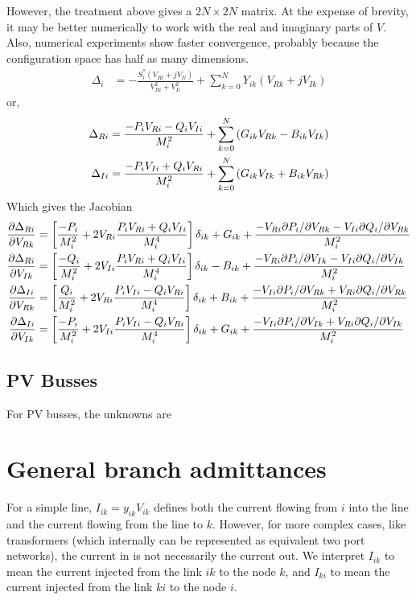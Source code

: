 \documentclass[11pt]{article}
\begin{document}
However, the treatment above gives a $2N \times 2N$ matrix. At the expense of brevity, it may be better numerically to work with the real and imaginary parts of $V$. Also, numerical experiments show faster convergence, probably because the configuration space has half as many dimensions.
\begin{align}
\Delta_i &= -\frac{S^*_i\left(V_{Ri}+jV_{Ii}\right)}{V_{Ri}^2 + V_{Ii}^2} + \sum_{k=0}^NY_{ik}\left(V_{Rk} + j V_{Ik}\right)
\end{align}
or,
\begin{align}
\Delta_{Ri} &= \frac{-P_iV_{Ri}-Q_iV_{Ii}}{M^2_i} + \sum_{k=0}^N\left(G_{ik}V_{Rk} - B_{ik}V_{Ik}\right)\notag \\
\Delta_{Ii} &= \frac{-P_iV_{Ii}+Q_iV_{Ri}}{M^2_i} + \sum_{k=0}^N\left(G_{ik}V_{Ik} + B_{ik}V_{Rk}\right)
\end{align}
Which gives the Jacobian
\begin{align}
\frac{\partial \Delta_{Ri}}{\partial V_{Rk}} &= \left[\frac{-P_i}{M^2_i} + 2V_{Ri}\frac{P_iV_{Ri} + Q_iV_{Ii}}{M^4_i}\right]\delta_{ik}+G_{ik} 
+\frac{-V_{Ri}\partial P_i/\partial V_{Rk}-V_{Ii}\partial Q_i/\partial V_{Rk}}{M^2_i}\notag \\
\frac{\partial \Delta_{Ri}}{\partial V_{Ik}} &= \left[\frac{-Q_i}{M^2_i} + 2V_{Ii}\frac{P_iV_{Ri} + Q_iV_{Ii}}{M^4_i}\right]\delta_{ik}-B_{ik}
+\frac{-V_{Ri}\partial P_i/\partial V_{Ik}-V_{Ii}\partial Q_i/\partial V_{Ik}}{M^2_i}\notag \\
\frac{\partial \Delta_{Ii}}{\partial V_{Rk}} &= \left[\frac{Q_i}{M^2_i} + 2V_{Ri}\frac{P_iV_{Ii} - Q_iV_{Ri}}{M^4_i}\right]\delta_{ik}+B_{ik}
+\frac{-V_{Ii}\partial P_i/\partial V_{Rk}+V_{Ri}\partial Q_i/\partial V_{Rk}}{M^2_i} \notag \\
\frac{\partial \Delta_{Ii}}{\partial V_{Ik}} &= \left[\frac{-P_i}{M^2_i} + 2V_{Ii}\frac{P_iV_{Ii} - Q_iV_{Ri}}{M^4_i}\right]\delta_{ik}+G_{ik}
+\frac{-V_{Ii}\partial P_i/\partial V_{Ik}+V_{Ri}\partial Q_i/\partial V_{Ik}}{M^2_i}
\end{align}

\subsection{PV Busses}
For PV busses, the unknowns are 

\section{General branch admittances}
For a simple line, $I_{ik} = y_{ik}V_{ik}$ defines both the current flowing from $i$ into the line and the current flowing from the line to $k$. However, for more complex cases, like transformers (which internally can be represented as equivalent two port networks), the current in is not necessarily the current out. We interpret $I_{ik}$ to mean the current injected from the link $ik$ to the node $k$, and $I_{ki}$ to mean the current injected from the link $ki$ to the node $i$.
\end{document}
